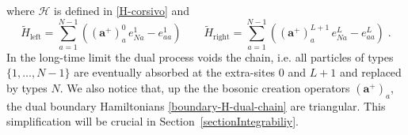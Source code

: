 \documentclass[10pt]{article}
\numberwithin{equation}{section}
\numberwithin{equation}{subsection}
\newcommand{\dt}{\;.}
\begin{document}
where $\mathcal{H}$ is defined in \eqref{H-corsivo} and 
\begin{equation}\label{boundary-H-dual-chain}
	\widetilde{H}_{\text{left}}=\sum_{a=1}^{N-1}\left((\mathbf{a}^{+})_{a}^{0}\,e_{Na}^{1}-e_{aa}^{1}\right)\qquad 	\widetilde{H}_{\text{right}}=\sum_{a=1}^{N-1}\left((\mathbf{a}^{+})_{a}^{L+1}\,e_{Na}^{L}-e_{aa}^{L}\right)\dt
\end{equation}
In the long-time limit the dual process voids the chain, i.e. all particles of types $\{1,\ldots,N-1\}$ are eventually absorbed at the extra-sites $0$ and $L+1$ and replaced by types $N$. We also notice that, up the the bosonic creation operators $(\mathbf{a}^{+})_{a}$, the dual boundary Hamiltonians \eqref{boundary-H-dual-chain} are triangular. This simplification will be crucial in Section~\ref{sectionIntegrabiliy}.\\
\end{document}
